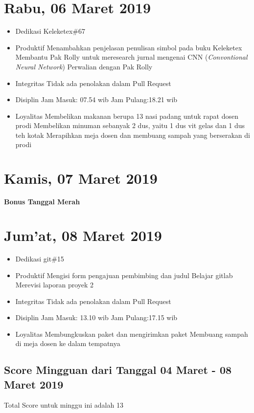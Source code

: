 \section{Rabu, 06 Maret 2019}
\begin{itemize}
\item Dedikasi
\subitem Keleketex\#67
\item Produktif
  \subitem Menambahkan penjelasan penulisan simbol pada buku Keleketex
  \subitem Membantu Pak Rolly untuk meresearch jurnal mengenai CNN (\textit{Convontional Neural Network})
  \subitem Perwalian dengan Pak Rolly
\item Integritas
  \subitem Tidak ada penolakan dalam Pull Request
\item Disiplin
  \subitem Jam Masuk: 07.54 wib
  \subitem Jam Pulang:18.21 wib
\item Loyalitas
  \subitem Membelikan makanan berupa 13 nasi padang untuk rapat dosen prodi 
  \subitem Membelikan minuman sebanyak 2 dus, yaitu 1 dus vit gelas dan 1 dus teh kotak
  \subitem Merapihkan meja dosen dan membuang sampah yang berserakan di prodi
\end{itemize}

\section{Kamis, 07 Maret 2019}
\textbf{Bonus Tanggal Merah}

\section{Jum'at, 08 Maret 2019}
\begin{itemize}
\item Dedikasi
  \subitem git\#15
\item Produktif
  \subitem Mengisi form pengajuan pembimbing dan judul
  \subitem Belajar gitlab
  \subitem Merevisi laporan proyek 2
\item Integritas
  \subitem Tidak ada penolakan dalam Pull Request
\item Disiplin
  \subitem Jam Masuk: 13.10 wib
  \subitem Jam Pulang:17.15 wib
\item Loyalitas
  \subitem Membungkuskan paket dan mengirimkan paket
  \subitem Membuang sampah di meja dosen ke dalam tempatnya
\end{itemize}

\subsection{Score Mingguan dari Tanggal 04 Maret - 08 Maret 2019}
Total Score untuk minggu ini adalah 13

